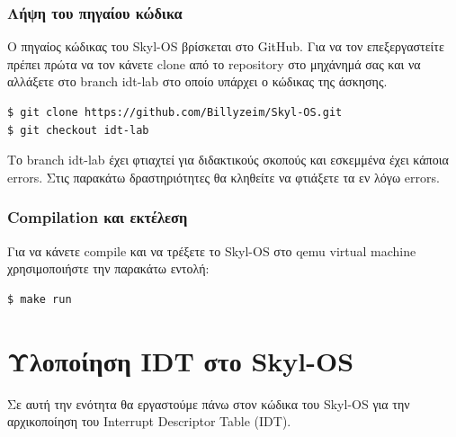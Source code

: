 \documentclass[18pt]{extarticle}
\begin{document}
\subsubsection{Λήψη του πηγαίου κώδικα}

Ο πηγαίος κώδικας του Skyl-OS βρίσκεται στο GitHub. Για να τον επεξεργαστείτε πρέπει πρώτα να τον κάνετε clone από το repository στο
μηχάνημά σας και να αλλάξετε στο branch idt-lab στο οποίο υπάρχει ο κώδικας της άσκησης.

\begin{commandline}
    \begin{verbatim}
$ git clone https://github.com/Billyzeim/Skyl-OS.git
$ git checkout idt-lab
    \end{verbatim}
\end{commandline}

\begin{info}[Σημείωση]
    Το branch idt-lab έχει φτιαχτεί για διδακτικούς σκοπούς και εσκεμμένα έχει κάποια errors. Στις παρακάτω δραστηριότητες θα κληθείτε
    να φτιάξετε τα εν λόγω errors.
\end{info}

\subsubsection{Compilation και εκτέλεση}

Για να κάνετε compile και να τρέξετε το Skyl-OS στο qemu virtual machine χρησιμοποιήστε την παρακάτω εντολή:

\begin{commandline}
    \begin{verbatim}
$ make run
    \end{verbatim}
\end{commandline}

\section{Υλοποίηση IDT στο Skyl-OS}

Σε αυτή την ενότητα θα εργαστούμε πάνω στον κώδικα του Skyl-OS για την αρχικοποίηση του Interrupt Descriptor Table (IDT).
\end{document}

